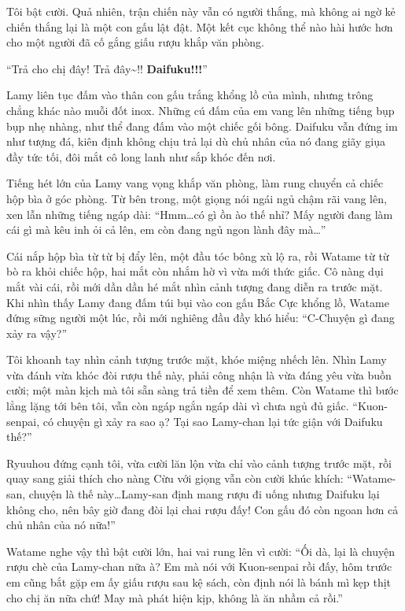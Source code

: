 \documentclass[../main.tex]{subfiles}
\begin{document}

Tôi bật cười. Quả nhiên, trận chiến này vẫn có người thắng, mà không ai ngờ kẻ chiến thắng lại là một con gấu lật đật. Một kết cục không thể nào hài hước hơn cho một người đã cố gắng giấu rượu khắp văn phòng.
\omk

``Trả cho chị đây! Trả đây\~{}!! \textbf{Daifuku!!!}''

Lamy liên tục đấm vào thân con gấu trắng khổng lồ của mình, nhưng trông chẳng khác nào muỗi đốt inox. Những cú đấm của em vang lên những tiếng bụp bụp nhẹ nhàng, như thể đang đấm vào một chiếc gối bông. Daifuku vẫn đứng im như tượng đá, kiên định không chịu trả lại dù chủ nhân của nó đang giãy giụa đầy tức tối, đôi mắt cô long lanh như sắp khóc đến nơi.

Tiếng hét lớn của Lamy vang vọng khắp văn phòng, làm rung chuyển cả chiếc hộp bìa ở góc phòng. Từ bên trong, một giọng nói ngái ngủ chậm rãi vang lên, xen lẫn những tiếng ngáp dài: ``Hmm\dots có gì ồn ào thế nhỉ? Mấy người đang làm cái gì mà kêu inh ỏi cả lên, em còn đang ngủ ngon lành đây mà\dots''

Cái nắp hộp bìa từ từ bị đẩy lên, một đầu tóc bông xù lộ ra, rồi Watame từ từ bò ra khỏi chiếc hộp, hai mắt còn nhắm hờ vì vừa mới thức giấc. Cô nàng dụi mắt vài cái, rồi mới dần dần hé mắt nhìn cảnh tượng đang diễn ra trước mặt. Khi nhìn thấy Lamy đang đấm túi bụi vào con gấu Bắc Cực khổng lồ, Watame đứng sững người một lúc, rồi mới nghiêng đầu đầy khó hiểu: ``C-Chuyện gì đang xảy ra vậy?''

Tôi khoanh tay nhìn cảnh tượng trước mặt, khóe miệng nhếch lên. Nhìn Lamy vừa đánh vừa khóc đòi rượu thế này, phải công nhận là vừa đáng yêu vừa buồn cười; một màn kịch mà tôi sẵn sàng trả tiền để xem thêm. Còn Watame thì bước lẳng lặng tới bên tôi, vẫn còn ngáp ngắn ngáp dài vì chưa ngủ đủ giấc. ``Kuon-senpai, có chuyện gì xảy ra sao ạ? Tại sao Lamy-chan lại tức giận với Daifuku thế?''

Ryuuhou đứng cạnh tôi, vừa cười lăn lộn vừa chỉ vào cảnh tượng trước mặt, rồi quay sang giải thích cho nàng Cừu với giọng vẫn còn cười khúc khích: ``Watame-san, chuyện là thế này\dots Lamy-san định mang rượu đi uống nhưng Daifuku lại không cho, nên bây giờ đang đòi lại chai rượu đấy! Con gấu đó còn ngoan hơn cả chủ nhân của nó nữa!''

Watame nghe vậy thì bật cười lớn, hai vai rung lên vì cười: ``Ối dà, lại là chuyện rượu chè của Lamy-chan nữa à? Em mà nói với Kuon-senpai rồi đấy, hôm trước em cũng bắt gặp em ấy giấu rượu sau kệ sách, còn định nói là bánh mì kẹp thịt cho chị ăn nữa chứ! May mà phát hiện kịp, không là ăn nhầm cả rồi.''
\end{document}
